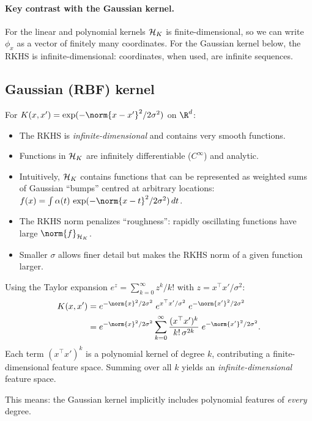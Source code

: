 \begin{notechapter}
\paragraph{Key contrast with the Gaussian kernel.}
For the linear and polynomial kernels $\mathcal{H}_K$ is finite-dimensional, so we can
write $\phi_x$ as a vector of finitely many coordinates. For the
Gaussian kernel below, the RKHS is
infinite-dimensional: coordinates, when used, are infinite sequences.

\subsection{Gaussian (RBF) kernel}

For $K(x,x') = \exp(-\norm{x-x'}^2/2\sigma^2)$ on $\R^d$:
\begin{itemize}
  \item The RKHS is \emph{infinite-dimensional} and contains very
  smooth functions.
  \item Functions in $\mathcal{H}_K$ are infinitely differentiable ($C^\infty$)
  and analytic.
  \item Intuitively, $\mathcal{H}_K$ contains functions that can be represented as
  weighted sums of Gaussian ``bumps'' centred at arbitrary locations:
  $f(x) = \int \alpha(t)\,\exp(-\norm{x-t}^2/2\sigma^2)\,dt$.
  \item The RKHS norm penalizes ``roughness'': rapidly oscillating
  functions have large $\norm{f}_{\hk}$.
  \item Smaller $\sigma$ allows finer detail but makes the RKHS norm of
  a given function larger.
\end{itemize}

\begin{intuition}
Using the Taylor expansion $e^z = \sum_{k=0}^\infty z^k/k!$ with $z =
x^\top x' / \sigma^2$:
\begin{align*}
K(x,x') &= e^{-\norm{x}^2/2\sigma^2}\; e^{x^\top x'/\sigma^2}\; e^{-\norm{x'}^2/2\sigma^2} \\
&= e^{-\norm{x}^2/2\sigma^2} \sum_{k=0}^\infty \frac{(x^\top x')^k}{k!\,\sigma^{2k}}\; e^{-\norm{x'}^2/2\sigma^2}.
\end{align*}
Each term $(x^\top x')^k$ is a polynomial kernel of degree $k$,
contributing a finite-dimensional feature space. Summing over all $k$
yields an \emph{infinite-dimensional} feature space.

This means: the Gaussian kernel implicitly includes polynomial features
of \emph{every} degree.
\end{intuition}


\end{notechapter}
